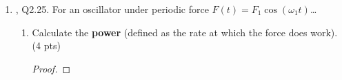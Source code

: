 \documentclass[../psets.tex]{subfiles}
\begin{document}
\begin{enumerate}
\begin{enumerate}
\begin{proof}



            In the  case. Unlike in the other two cases, where some energy is lost due to imperfect synchronization of the oscillator and this pseudo-driving force, here, all of the energy that can be gained is gained. In particular, critical damping is faster than underdamping because $\gamma$ is just really small here ($<\omega_0$), and critical damping is faster than overdamping because $\gamma_-$ dominates in the long run in that case.
        \end{proof}
    \end{enumerate}
    \item \textcite{bib:KibbleBerkshire}, Q2.25. For an oscillator under periodic force $F(t)=F_1\cos(\omega_1t)$\dots
    \begin{enumerate}
        \item Calculate the \textbf{power} (defined as the rate at which the force does work). (4 pts)
        \begin{proof}





\end{proof}
\end{enumerate}
\end{enumerate}
\end{document}
